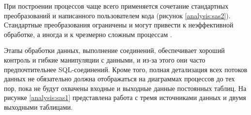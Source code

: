 \begin{figure}[ht!]
\end{figure}

При построении процессов чаще всего применяется сочетание стандартных преобразований 
и написанного пользователем кода (рисунок \ref{analysis:sas2}).
Стандартные преобразования ограничены и могут привести к неэффективной обработке, а иногда и 
к чрезмерно сложным процессам \cite{bib13}. 

\begin{figure}[ht!]
\end{figure}

Этапы обработки данных, выполнение соединений, обеспечивает хороший контроль и гибкие
манипуляции с данными, и из-за этого они часто предпочтительнее SQL-соединений.  
Кроме того, полная детализация всех потоков данных не обязательно должна отображаться 
на диаграммах процессов до тех пор, пока не будут охвачены входные и выходные данные постоянных таблиц.
На рисунке \ref{analysis:sas1} представлена работа с тремя источниками данных и двумя выходными таблицами.

